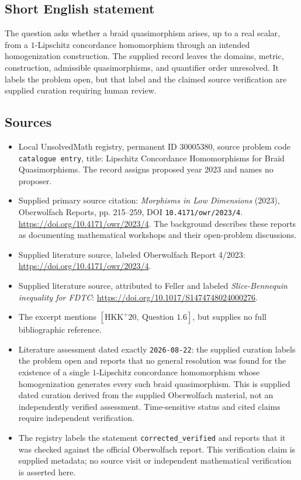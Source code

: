 \documentclass[11pt]{article}
\begin{document}
\subsection{Short English statement}
The question asks whether a braid quasimorphism arises, up to a real scalar, from a \(1\)-Lipschitz concordance homomorphism through an intended homogenization construction. The supplied record leaves the domains, metric, construction, admissible quasimorphisms, and quantifier order unresolved. It labels the problem open, but that label and the claimed source verification are supplied curation requiring human review.
\subsection{Sources}
\begin{itemize}
\item Local UnsolvedMath registry, permanent ID \(30005380\), source problem code \texttt{catalogue entry}, title: Lipschitz Concordance Homomorphisms for Braid Quasimorphisms. The record assigns proposed year 2023 and names no proposer.
\item Supplied primary source citation: \emph{Morphisms in Low Dimensions} (2023), Oberwolfach Reports, pp. 215--259, DOI \texttt{10.4171/owr/2023/4}. \url{https://doi.org/10.4171/owr/2023/4}. The background describes these reports as documenting mathematical workshops and their open-problem discussions.
\item Supplied literature source, labeled Oberwolfach Report 4/2023: \url{https://doi.org/10.4171/owr/2023/4}.
\item Supplied literature source, attributed to Feller and labeled \emph{Slice-Bennequin inequality for FDTC}: \url{https://doi.org/10.1017/S1474748024000276}.
\item The excerpt mentions \([\mathrm{HKK}^{+}20,\ \text{Question }1.6]\), but supplies no full bibliographic reference.
\item Literature assessment dated exactly \texttt{2026-08-22}: the supplied curation labels the problem open and reports that no general resolution was found for the existence of a single \(1\)-Lipschitz concordance homomorphism whose homogenization generates every such braid quasimorphism. This is supplied dated curation derived from the supplied Oberwolfach material, not an independently verified assessment. Time-sensitive status and cited claims require independent verification.
\item The registry labels the statement \texttt{corrected\_verified} and reports that it was checked against the official Oberwolfach report. This verification claim is supplied metadata; no source visit or independent mathematical verification is asserted here.
\end{itemize}
\end{document}
